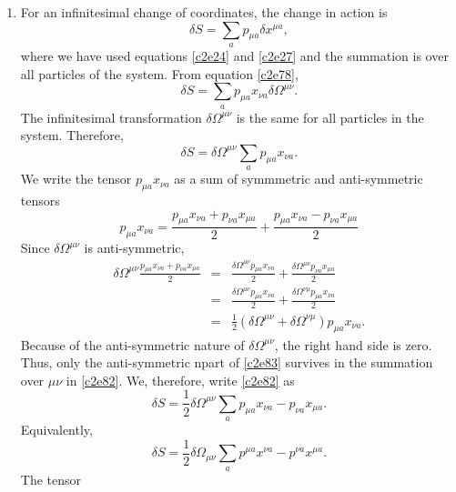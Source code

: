 \begin{enumerate}
\item For an infinitesimal change of coordinates, the change in action is
\begin{equation}\label{c2e80}
\delta S = \sum_{a} p_{\mu a}\delta x^{\mu a},
\end{equation}
where we have used equations \eqref{c2e24} and \eqref{c2e27} and the summation
is over all particles of the system. From equation \eqref{c2e78},
\begin{equation}\label{c2e81}
\delta S = \sum_{a} p_{\mu a}x_{\nu a}\delta\Omega^{\mu\nu}.
\end{equation}
The infinitesimal transformation $\delta\Omega^{\mu\nu}$ is the same for all
particles in the system. Therefore,
\begin{equation}\label{c2e82}
\delta S = \delta\Omega^{\mu\nu}\sum_{a} p_{\mu a}x_{\nu a}.
\end{equation}
We write the tensor $p_{\mu a}x_{\nu a}$ as a sum of symmmetric and anti-symmetric
tensors
\begin{equation}\label{c2e83}
p_{\mu a}x_{\nu a} = \frac{p_{\mu a}x_{\nu a} + p_{\nu a}x_{\mu a}}{2} +
\frac{p_{\mu a}x_{\nu a} - p_{\nu a}x_{\mu a}}{2}
\end{equation}
Since $\delta\Omega^{\mu\nu}$ is anti-symmetric,
\begin{eqnarray*}
\delta\Omega^{\mu\nu}\frac{p_{\mu a}x_{\nu a} + p_{\nu a}x_{\mu a}}{2} &=&
\frac{\delta\Omega^{\mu\nu}p_{\mu a}x_{\nu a}}{2} + 
\frac{\delta\Omega^{\mu\nu}p_{\nu a}x_{\mu a}}{2} \\
 &=& \frac{\delta\Omega^{\mu\nu}p_{\mu a}x_{\nu a}}{2} + 
\frac{\delta\Omega^{\nu\mu}p_{\mu a}x_{\nu a}}{2} \\
 &=& \frac{1}{2}(\delta\Omega^{\mu\nu} + \delta\Omega^{\nu\mu})p_{\mu a}x_{\nu a}.
\end{eqnarray*}
Because of the anti-symmetric nature of $\delta\Omega^{\mu\nu}$, the right hand 
side is zero. Thus, only the anti-symmetric npart of \eqref{c2e83} survives in
the summation over $\mu\nu$ in \eqref{c2e82}. We, therefore, write \eqref{c2e82}
as
\begin{equation}\label{c2e84}
\delta S = \frac{1}{2}\delta\Omega^{\mu\nu}\sum_{a}p_{\mu a}x_{\nu a} - p_{\nu a}x_{\mu a}.
\end{equation}
Equivalently,
\begin{equation}\label{c2e85}
\delta S = \frac{1}{2}\delta\Omega_{\mu\nu}\sum_{a}p^{\mu a}x^{\nu a} - p^{\nu a}x^{\mu a}.
\end{equation}
The tensor
\begin{equation}\label{c2e86}

\end{equation}
\end{enumerate}
